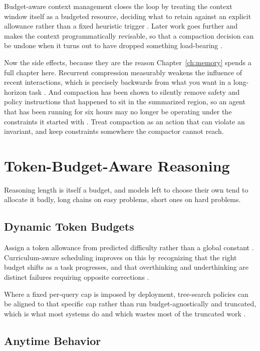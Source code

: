 Budget-aware context management closes the loop by treating the context window
itself as a budgeted resource, deciding what to retain against an explicit
allowance rather than a fixed heuristic trigger \cite{contextbudget2026}. Later
work goes further and makes the context programmatically revisable, so that a
compaction decision can be undone when it turns out to have dropped something
load-bearing \cite{contextenv2026}.

Now the side effects, because they are the reason Chapter~\ref{ch:memory} spends
a full chapter here. Recurrent compression measurably weakens the influence of
recent interactions, which is precisely backwards from what you want in a
long-horizon task \cite{compressreliab2026}. And compaction has been shown to
silently remove safety and policy instructions that happened to sit in the
summarized region, so an agent that has been running for six hours may no longer
be operating under the constraints it started with \cite{govdecay2026}. Treat
compaction as an action that can violate an invariant, and keep constraints
somewhere the compactor cannot reach.

\section{Token-Budget-Aware Reasoning}

Reasoning length is itself a budget, and models left to choose their own tend to
allocate it badly, long chains on easy problems, short ones on hard problems.

\subsection{Dynamic Token Budgets}

Assign a token allowance from predicted difficulty rather than a global constant
\cite{tokenbudget2025}. Curriculum-aware scheduling improves on this by
recognizing that the right budget shifts as a task progresses, and that
overthinking and underthinking are distinct failures requiring opposite
corrections \cite{curriculumbudget2026}.

Where a fixed per-query cap is imposed by deployment, tree-search policies can be
aligned to that specific cap rather than run budget-agnostically and truncated,
which is what most systems do and which wastes most of the truncated work
\cite{treebudget2026}.

\subsection{Anytime Behavior}

